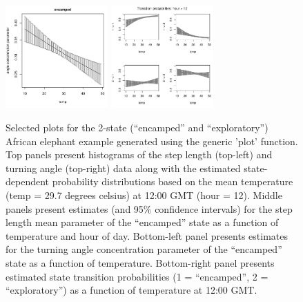 \documentclass[12pt]{article}\usepackage[]{graphicx}\usepackage[]{color}
\begin{document}
\begin{figure}[htbp]
  \includegraphics[width=0.35\textwidth]{plot_elephantResults010.pdf}
  \includegraphics[width=0.35\textwidth]{plot_elephantResults013.pdf} \\
  \caption{Selected plots for the 2-state (``encamped'' and ``exploratory'') African elephant example generated using the generic 'plot' function. Top panels present histograms of the step length (top-left) and turning angle (top-right) data along with the estimated state-dependent probability distributions based on the mean temperature (temp = 29.7 degrees celsius) at 12:00 GMT (hour = 12). Middle panels present estimates (and 95\% confidence intervals) for the step length mean parameter of the ``encamped'' state as a function of temperature and hour of day.  Bottom-left panel presents estimates for the turning angle concentration parameter of the ``encamped'' state as a function of temperature.  Bottom-right panel presents estimated state transition probabilities (1 = ``encamped'', 2 = ``exploratory'') as a function of temperature at 12:00 GMT.}
  \label{fig:elephantResults2}
\end{figure}
\end{document}
